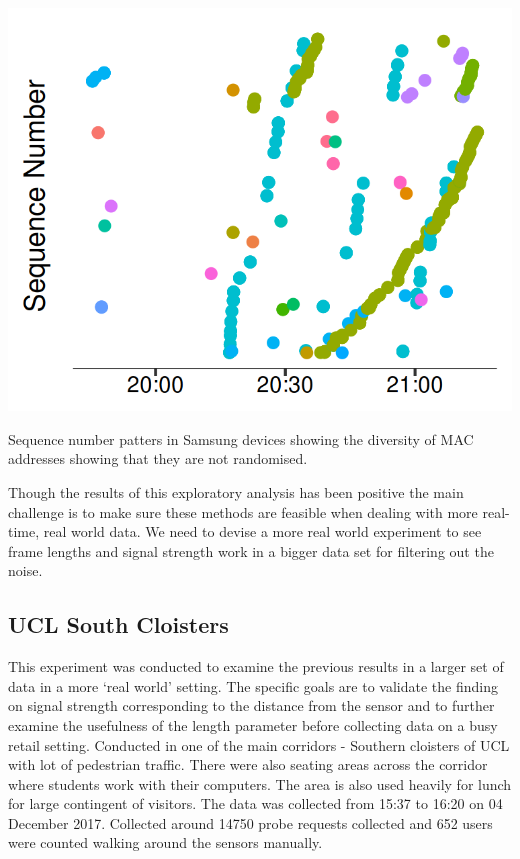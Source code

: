 \begin{marginfigure}
  \forcerectofloat
  \includegraphics{images/home-samsung-google.png}
  \caption{Sequence number patters in Samsung devices showing the diversity of MAC addresses showing that they are not randomised.}
  \label{figure:collection:home:samsung}
\end{marginfigure}

Though the results of this exploratory analysis has been positive the main challenge is to make sure these methods are feasible when dealing with more real-time, real world data.
We need to devise a more real world experiment to see frame lengths and signal strength work in a bigger data set for filtering out the noise. 

\subsection{UCL South Cloisters}
This experiment was conducted to examine the previous results in a larger set of data in a more `real world' setting.
The specific goals are to validate the finding on signal strength corresponding to the distance from the sensor and to further examine the usefulness of the length parameter before collecting data on a busy retail setting.
Conducted in one of the main corridors - Southern cloisters of UCL with lot of pedestrian traffic.
There were also seating areas across the corridor where students work with their computers.
The area is also used heavily for lunch for large contingent of visitors.
The data was collected from 15:37 to 16:20 on 04 December 2017.
Collected around 14750 probe requests collected and 652 users were counted walking around the sensors manually.

